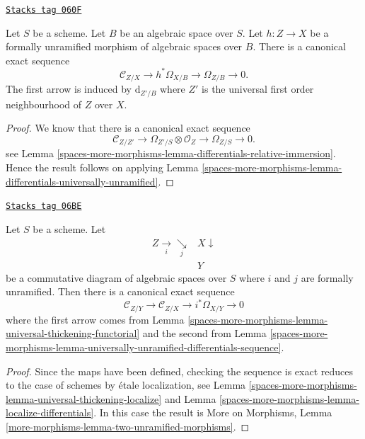 \begin{lemma}
\label{spaces-more-morphisms-lemma-universally-unramified-differentials-sequence}
\href{https://stacks.math.columbia.edu/tag/060F}{\texttt{Stacks tag 060F}}

Let $S$ be a scheme. Let $B$ be an algebraic space over $S$.
Let $h : Z \to X$ be a formally unramified morphism of algebraic
spaces over $B$.
There is a canonical exact sequence
$$
\mathcal{C}_{Z/X} \to h^*\Omega_{X/B} \to \Omega_{Z/B} \to 0.
$$
The first arrow is induced by $\text{d}_{Z'/B}$ where
$Z'$ is the universal first order neighbourhood of $Z$ over $X$.
\end{lemma}

\begin{proof}
We know that there is a canonical exact sequence
$$
\mathcal{C}_{Z/Z'} \to
\Omega_{Z'/S} \otimes \mathcal{O}_Z \to
\Omega_{Z/S} \to 0.
$$
see
Lemma \ref{spaces-more-morphisms-lemma-differentials-relative-immersion}.
Hence the result follows on applying
Lemma \ref{spaces-more-morphisms-lemma-differentials-universally-unramified}.
\end{proof}

\begin{lemma}
\label{spaces-more-morphisms-lemma-two-unramified-morphisms}
\href{https://stacks.math.columbia.edu/tag/06BE}{\texttt{Stacks tag 06BE}}

Let $S$ be a scheme. Let
$$
\begin{array}{cc}Z \underset{i}{\longrightarrow}\underset{j}{\searrow} & X \downarrow \\  & Y\end{array}
$$
be a commutative diagram of algebraic spaces over $S$
where $i$ and $j$ are formally unramified. Then there is a
canonical exact sequence
$$
\mathcal{C}_{Z/Y} \to
\mathcal{C}_{Z/X} \to
i^*\Omega_{X/Y} \to 0
$$
where the first arrow comes from
Lemma \ref{spaces-more-morphisms-lemma-universal-thickening-functorial}
and the second from
Lemma \ref{spaces-more-morphisms-lemma-universally-unramified-differentials-sequence}.
\end{lemma}

\begin{proof}
Since the maps have been defined, checking the sequence is exact
reduces to the case of schemes by \'etale localization, see
Lemma \ref{spaces-more-morphisms-lemma-universal-thickening-localize}
and
Lemma \ref{spaces-more-morphisms-lemma-localize-differentials}.
In this case the result is
More on Morphisms,
Lemma \ref{more-morphisms-lemma-two-unramified-morphisms}.
\end{proof}


